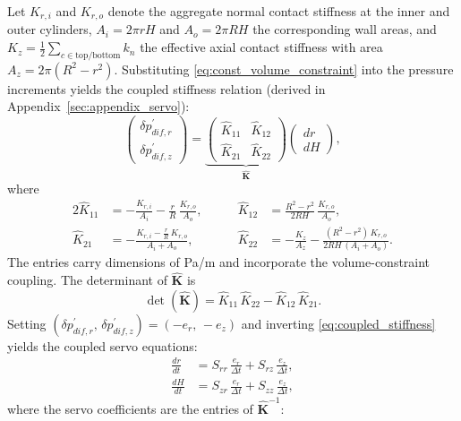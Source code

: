 Let $K_{r,i}$ and $K_{r,o}$ denote the aggregate normal contact stiffness at the inner and outer cylinders, $A_i=2\pi rH$ and $A_o=2\pi RH$ the corresponding wall areas, and $K_z=\frac{1}{2}\sum_{c\in\mathrm{top/bottom}} k_n$ the effective axial contact stiffness with area $A_z=2\pi(R^2-r^2)$. Substituting \cref{eq:const_volume_constraint} into the pressure increments yields the coupled stiffness relation (derived in Appendix~\ref{sec:appendix_servo}):
\begin{equation}
\begin{pmatrix} \delta p_{dif,r}^{\prime} \\[4pt] \delta p_{dif,z}^{\prime} \end{pmatrix}
=
\underbrace{\begin{pmatrix} \hat{K}_{11} & \hat{K}_{12} \\[6pt] \hat{K}_{21} & \hat{K}_{22} \end{pmatrix}}_{\hat{\mathbf{K}}}
\begin{pmatrix} dr \\[4pt] dH \end{pmatrix},
\label{eq:coupled_stiffness}
\end{equation}
where
\begin{alignat}{2}
\hat{K}_{11} &= -\frac{K_{r,i}}{A_i}-\frac{r}{R}\,\frac{K_{r,o}}{A_o}, &\qquad
\hat{K}_{12} &= \frac{R^2-r^2}{2RH}\,\frac{K_{r,o}}{A_o}, \label{eq:Khat_main_row1}\\[4pt]
\hat{K}_{21} &= -\frac{K_{r,i}-\frac{r}{R}\,K_{r,o}}{A_i+A_o}, &\qquad
\hat{K}_{22} &= -\frac{K_z}{A_z}-\frac{(R^2-r^2)\,K_{r,o}}{2RH\,(A_i+A_o)}. \label{eq:Khat_main_row2}
\end{alignat}
The entries carry dimensions of Pa/m and incorporate the volume-constraint coupling. The determinant of $\hat{\mathbf{K}}$ is
\begin{equation}
\det(\hat{\mathbf{K}}) = \hat{K}_{11}\,\hat{K}_{22} - \hat{K}_{12}\,\hat{K}_{21}.
\label{eq:det_K_main}
\end{equation}
Setting $(\delta p_{dif,r}^{\prime},\,\delta p_{dif,z}^{\prime})=(-e_r,\,-e_z)$ and inverting \cref{eq:coupled_stiffness} yields the coupled servo equations:
\begin{align}
\frac{dr}{dt} &= S_{rr}\,\frac{e_r}{\Delta t} + S_{rz}\,\frac{e_z}{\Delta t}, \label{eq:servo_dr}\\[6pt]
\frac{dH}{dt} &= S_{zr}\,\frac{e_r}{\Delta t} + S_{zz}\,\frac{e_z}{\Delta t}, \label{eq:servo_dH}
\end{align}
where the servo coefficients are the entries of $\hat{\mathbf{K}}^{-1}$:

